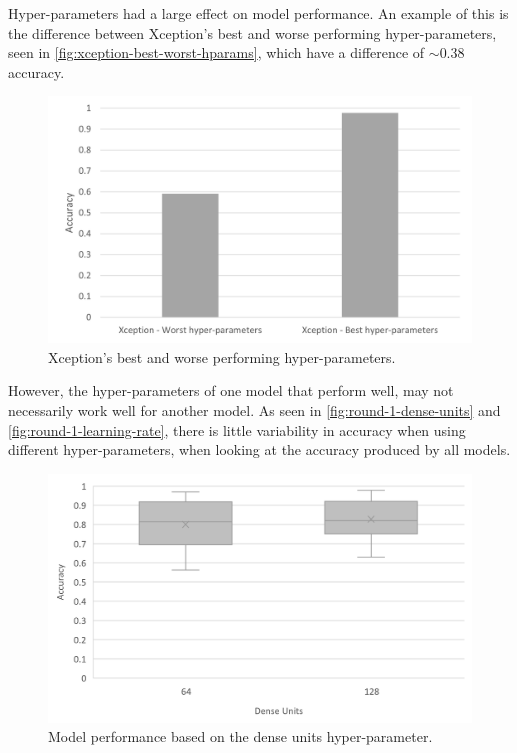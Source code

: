 Hyper-parameters had a large effect on model performance. An example of this is the difference between Xception's best and worse performing hyper-parameters, seen in \autoref{fig:xception-best-worst-hparams}, which have a difference of $\sim$0.38 accuracy.

\begin{figure}[H]
    \centering
    \includegraphics[width=\textwidth]{figures/xception-best-worst-hparams.png}
    \caption{Xception's best and worse performing hyper-parameters.}
    \label{fig:xception-best-worst-hparams}
\end{figure}

However, the hyper-parameters of one model that perform well, may not necessarily work well for another model. As seen in \autoref{fig:round-1-dense-units} and \autoref{fig:round-1-learning-rate}, there is little variability in accuracy when using different hyper-parameters, when looking at the accuracy produced by all models.

\begin{figure}[H]
    \centering
    \includegraphics[width=\textwidth]{figures/round-1-dense-units.png}
    \caption{Model performance based on the dense units hyper-parameter.}
    \label{fig:round-1-dense-units}
\end{figure}

